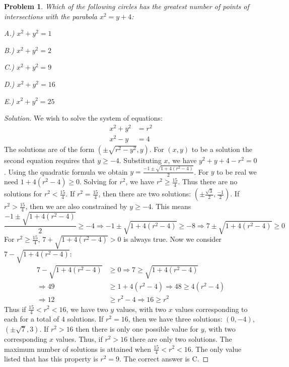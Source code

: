 \documentclass[oneside]{book}
\theoremstyle{mystyle}
\newtheorem{problem}{Problem}[section]
\begin{document}
\begin{problem}
Which of the following circles has the greatest number of points of intersections with the parabola $x^2 = y+4$:
\begin{enumerate}
\begin{multicols}{5}
\item[A.)] $x^2+y^2 = 1$
\item[B.)] $x^2+y^2 = 2$
\item[C.)] $x^2+y^2 = 9$
\item[D.)] $x^2+y^2 = 16$
\item[E.)] $x^2+y^2=25$
\end{multicols}
\end{enumerate}
\end{problem}
\begin{proof}[Solution]
We wish to solve the system of equations:
\begin{align}
    \nonumber x^2+y^2 &= r^2 \\
    \nonumber x^2-y &= 4
\end{align}
The solutions are of the form $(\pm \sqrt{r^2-y^2},y)$. For $(x,y)$ to be a solution the second equation requires that $y\geq -4$. Substituting $x$, we have $y^2+y+4 - r^2 = 0$. Using the quadratic formula we obtain $y = \frac{-1 \pm \sqrt{1 + 4(r^2-4)}}{2}$. For $y$ to be real we need $1+4(r^2-4) \geq 0$. Solving for $r^2$, we have $r^2 \geq \frac{15}{4}$. Thus there are no solutions for $r^2< \frac{15}{4}$. If $r^2 = \frac{15}{4}$, then there are two solutions: $(\pm \frac{\sqrt{3}}{2}, \frac{-1}{2})$. If $r^2 > \frac{15}{4}$, then we are also constrained by $y\geq -4$. This means 
\begin{equation}
    \nonumber \frac{-1 \pm \sqrt{1+4(r^2-4)}}{2}  \geq -4 \Rightarrow -1 \pm \sqrt{1+4(r^2-4)} \geq -8 \Rightarrow 7  \pm \sqrt{1+4(r^2-4)} \geq 0
\end{equation}
 For $r^2 \geq \frac{15}{4}$, $7+\sqrt{1+4(r^2-4)}>0$ is always true. Now we consider $7-\sqrt{1+4(r^2-4)}:$
\begin{align}
    \nonumber 7-\sqrt{1+4(r^2-4)} &\geq 0 \Rightarrow 7 \geq \sqrt{1+4(r^2-4)} \\
    \nonumber \Rightarrow 49 &\geq 1+4(r^2-4) \Rightarrow 48 \geq 4(r^2-4) \\
    \nonumber \Rightarrow 12 &\geq r^2 - 4 \Rightarrow 16 \geq r^2
\end{align}
Thus if $\frac{15}{4}<r^2<16$, we have two $y$ values, with two $x$ values corresponding to each for a total of $4$ solutions. If $r^2 = 16$, then we have three solutions: $(0,-4)$, $(\pm \sqrt{7},3)$. If $r^2>16$ then there is only one possible value for $y$, with two corresponding $x$ values. Thus, if $r^2>16$ there are only two solutions. The maximum number of solutions is attained when $\frac{15}{4} < r^2 <16$. The only value listed that has this property is $r^2 = 9$. The correct answer is C.
\end{proof}
\end{document}
